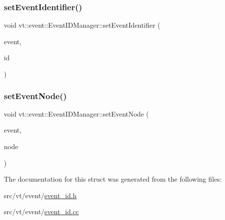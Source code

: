 \subsubsection{\texorpdfstring{set\+Event\+Identifier()}{setEventIdentifier()}}
{\footnotesize\ttfamily void vt\+::event\+::\+Event\+I\+D\+Manager\+::set\+Event\+Identifier (\begin{DoxyParamCaption}\item[{\hyperlink{namespacevt_a009267401def7ae8bf201892222d060f}{Event\+Type} \&}]{event,  }\item[{\hyperlink{namespacevt_1_1event_a0893245b7a220f3fe6951382e3038afa}{Event\+Identifier\+Type} const \&}]{id }\end{DoxyParamCaption})\hspace{0.3cm}{\ttfamily [static]}}

\mbox{\label{structvt_1_1event_1_1_event_i_d_manager_a6da7fb1cb3861a3855bb5d7aeca0caff}} 
\subsubsection{\texorpdfstring{set\+Event\+Node()}{setEventNode()}}
{\footnotesize\ttfamily void vt\+::event\+::\+Event\+I\+D\+Manager\+::set\+Event\+Node (\begin{DoxyParamCaption}\item[{\hyperlink{namespacevt_a009267401def7ae8bf201892222d060f}{Event\+Type} \&}]{event,  }\item[{\hyperlink{namespacevt_a866da9d0efc19c0a1ce79e9e492f47e2}{Node\+Type} const \&}]{node }\end{DoxyParamCaption})\hspace{0.3cm}{\ttfamily [static]}}



The documentation for this struct was generated from the following files\+:\begin{DoxyCompactItemize}
\item 
src/vt/event/\hyperlink{event__id_8h}{event\+\_\+id.\+h}\item 
src/vt/event/\hyperlink{event__id_8cc}{event\+\_\+id.\+cc}\end{DoxyCompactItemize}
